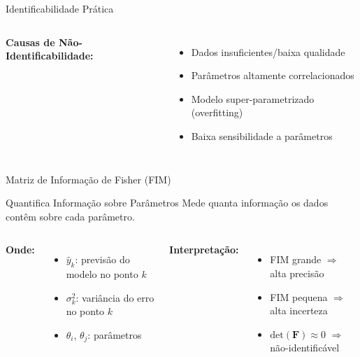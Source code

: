 \begin{frame}{Identificabilidade Prática}

\begin{columns}
\textbf{Causas de Não-Identificabilidade:}
\begin{itemize}\small
    \item Dados insuficientes/baixa qualidade
    \item Parâmetros altamente correlacionados
    \item Modelo super-parametrizado (overfitting)
    \item Baixa sensibilidade a parâmetros
\end{itemize}

\end{columns}
\end{frame}

\begin{frame}{Matriz de Informação de Fisher (FIM)}
\begin{block}{Quantifica Informação sobre Parâmetros}
Mede quanta informação os dados contêm sobre cada parâmetro.
\end{block}


\begin{columns}
\textbf{Onde:}
\begin{itemize}\small
    \item $\hat{y}_k$: previsão do modelo no ponto $k$
    \item $\sigma_k^2$: variância do erro no ponto $k$
    \item $\theta_i$, $\theta_j$: parâmetros
\end{itemize}

\textbf{Interpretação:}
\begin{itemize}\small
    \item FIM grande $\Rightarrow$ alta precisão
    \item FIM pequena $\Rightarrow$ alta incerteza
    \item $\text{det}(\mathbf{F}) \approx 0$ $\Rightarrow$ não-identificável
\end{itemize}
\end{columns}
\end{frame}

